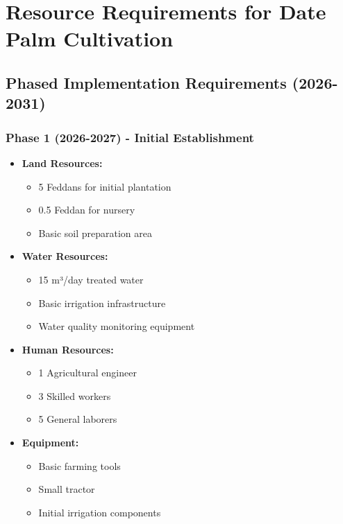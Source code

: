 \section{Resource Requirements for Date Palm Cultivation}

\subsection{Phased Implementation Requirements (2026-2031)}

\subsubsection{Phase 1 (2026-2027) - Initial Establishment}
\begin{itemize}
    \item \textbf{Land Resources:}
    \begin{itemize}
        \item 5 Feddans for initial plantation
        \item 0.5 Feddan for nursery
        \item Basic soil preparation area
    \end{itemize}
    \item \textbf{Water Resources:}
    \begin{itemize}
        \item 15 m³/day treated water
        \item Basic irrigation infrastructure
        \item Water quality monitoring equipment
    \end{itemize}
    \item \textbf{Human Resources:}
    \begin{itemize}
        \item 1 Agricultural engineer
        \item 3 Skilled workers
        \item 5 General laborers
    \end{itemize}
    \item \textbf{Equipment:}
    \begin{itemize}
        \item Basic farming tools
        \item Small tractor
        \item Initial irrigation components
    \end{itemize}
\end{itemize}

